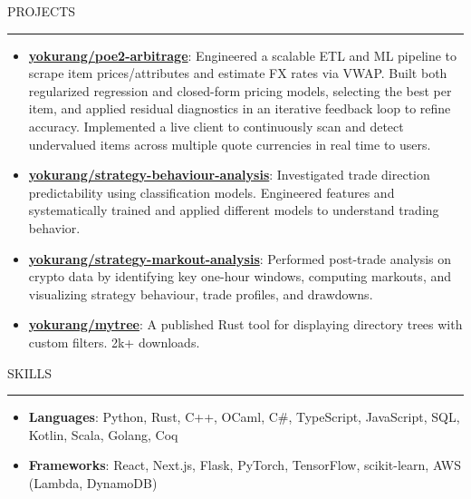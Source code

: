 \documentclass[letterpaper, 11pt]{article}
\def\sectionlineskip{\medskip}
\def\sectionskip{\medskip}
\def \entryspacing {-0pt}
\newcommand{\SectionHeading}[1]{
  \sectionskip
  \raggedright\raggedbottom\MakeUppercase{\large{#1}}
  \sectionlineskip
  \hrule
  \color{black}
}
\newcommand{\ResumeItem}[2]{
  \item{
    \textbf{#1}{: #2 \vspace{-2.835pt}}
  }
}
\newcommand{\ResumeProjectItem}[3]{
  \item{
    \href{#2}{\textbf{#1}}{: #3 \vspace{-2.835pt}}
  }
}
\newcommand{\ResumeEntryStart}{\begin{itemize}[leftmargin=0mm, label={}]}
\newcommand{\ResumeEntryEnd}{\end{itemize}\vspace{-2.835pt}} %
\newcommand{\ProjectItemListStart}{\begin{itemize}[leftmargin=*, label=$\bullet$]}
\newcommand{\ProjectItemListEnd}{\end{itemize}\vspace{\entryspacing}}
\begin{document}
  \SectionHeading{Projects}
  \ProjectItemListStart
  \ResumeProjectItem{yokurang/poe2-arbitrage}
  {https://github.com/yokurang/path-of-elixe}
  {Engineered a scalable ETL and ML pipeline to scrape item prices/attributes and estimate FX rates via VWAP. Built both regularized regression and closed-form pricing models, selecting the best per item, and applied residual diagnostics in an iterative feedback loop to refine accuracy. Implemented a live client to continuously scan and detect undervalued items across multiple quote currencies in real time to users.}

  \ResumeProjectItem{yokurang/strategy-behaviour-analysis}
  {https://github.com/yokurang/trading-strategy-behavior-analysis}
  {Investigated trade direction predictability using classification models.
  Engineered features and systematically trained and applied different models to understand trading behavior.}

  \ResumeProjectItem{yokurang/strategy-markout-analysis}
  {https://github.com/yokurang/trading-strategy-markout-analysis}
  {Performed post-trade analysis on crypto data by identifying key one-hour windows, computing markouts, and visualizing strategy behaviour, trade profiles, and drawdowns.}

  \ResumeProjectItem{yokurang/mytree}
  {https://github.com/yokurang/mytree}
  {A published Rust tool for displaying directory trees with custom filters. 2k+ downloads.}
  \ProjectItemListEnd

  \SectionHeading{Skills}
  \ResumeEntryStart
    \ResumeItem{Languages}{ Python, Rust, C++, OCaml, C\#, TypeScript, JavaScript, SQL, Kotlin, Scala, Golang, Coq }
    \ResumeItem{Frameworks}{ React, Next.js, Flask, PyTorch, TensorFlow, scikit-learn, AWS (Lambda, DynamoDB) }
  \ResumeEntryEnd
\end{document}
